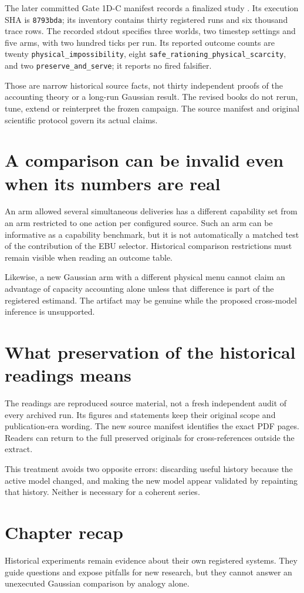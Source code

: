The later committed Gate 1D-C manifest records a finalized study
\cite{gate}. Its execution SHA is \texttt{8793bda}; its inventory contains
thirty registered runs and six thousand trace rows. The recorded stdout
specifies three worlds, two timestep settings and five arms, with two
hundred ticks per run. Its reported outcome counts are twenty
\texttt{physical\_impossibility}, eight
\texttt{safe\_rationing\_physical\_scarcity}, and two
\texttt{preserve\_and\_serve}; it reports no fired falsifier.

Those are narrow historical source facts, not thirty independent proofs
of the accounting theory or a long-run Gaussian result. The revised books
do not rerun, tune, extend or reinterpret the frozen campaign. The source
manifest and original scientific protocol govern its actual claims.

\section{A comparison can be invalid even when its numbers are real}
An arm allowed several simultaneous deliveries has a different capability
set from an arm restricted to one action per configured source. Such an
arm can be informative as a capability benchmark, but it is not automatically
a matched test of the contribution of the EBU selector. Historical
comparison restrictions must remain visible when reading an outcome table.

Likewise, a new Gaussian arm with a different physical menu cannot claim
an advantage of capacity accounting alone unless that difference is part
of the registered estimand. The artifact may be genuine while the proposed
cross-model inference is unsupported.

\section{What preservation of the historical readings means}
The readings are reproduced source material, not a fresh independent audit
of every archived run. Its figures and statements keep their original
scope and publication-era wording. The new source manifest identifies the
exact PDF pages. Readers can return to the full preserved originals for
cross-references outside the extract.

This treatment avoids two opposite errors: discarding useful history
because the active model changed, and making the new model appear validated
by repainting that history. Neither is necessary for a coherent series.

\section*{Chapter recap}
Historical experiments remain evidence about their own registered systems.
They guide questions and expose pitfalls for new research, but they cannot
answer an unexecuted Gaussian comparison by analogy alone.
